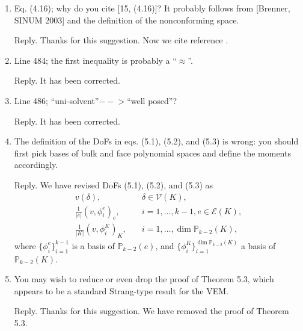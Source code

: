 \documentclass[10pt]{amsart}
\theoremstyle{definition}
\theoremstyle{remark}
\begin{document}
\begin{enumerate}[1.]
\medskip

\item \textsf{Eq. (4.16); why do you cite [15, (4.16)]? It probably follows from [Brenner, SINUM 2003] and the definition of the nonconforming space.}

\smallskip \noindent \textcolor[rgb]{1.00,0.00,0.00}{Reply.}
Thanks for this suggestion.
Now we cite reference \cite{Brenner2003}.

\medskip

\item \textsf{Line 484; the first inequality is probably a “$\approx$”.}

\smallskip \noindent \textcolor[rgb]{1.00,0.00,0.00}{Reply.}
It has been corrected.

\medskip

\item \textsf{Line 486; “uni-solvent”$-\!\!\!-\!\!\!>$“well posed”?}

\smallskip \noindent \textcolor[rgb]{1.00,0.00,0.00}{Reply.}
It has been corrected.

\medskip

\item \textsf{The definition of the DoFs in eqs. (5.1), (5.2), and (5.3) is wrong: you should first pick bases of bulk and face polynomial spaces and define the moments accordingly.}

\smallskip \noindent \textcolor[rgb]{1.00,0.00,0.00}{Reply.}
We have revised DoFs (5.1), (5.2), and (5.3) as
\begin{align*}
v(\delta), & \quad \delta\in\mathcal V(K), \\
\frac{1}{|e|}(v, \phi_i^e)_e, & \quad i=1,\ldots, k-1, e\in\mathcal E(K), \\
\frac{1}{|K|}(v, \phi_i^K)_K, & \quad i=1,\ldots, \dim\mathbb P_{k-2}(K),
\end{align*}
where $\{\phi_i^e\}_{i=1}^{k-1}$ is a basis of $\mathbb P_{k-2}(e)$, and $\{\phi_i^K\}_{i=1}^{\dim\mathbb P_{k-2}(K)}$ a basis of $\mathbb P_{k-2}(K)$.

\medskip

\item \textsf{You may wish to reduce or even drop the proof of Theorem 5.3, which appears to be a standard Strang-type result for the VEM.}

\smallskip \noindent \textcolor[rgb]{1.00,0.00,0.00}{Reply.}
Thanks for this suggestion. We have removed the proof of Theorem 5.3.

\medskip


\end{enumerate}
\end{document}

